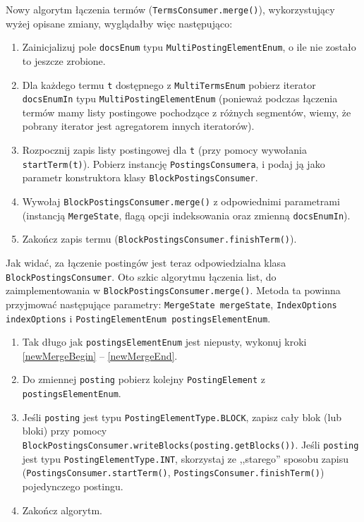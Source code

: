 Nowy algorytm łączenia termów (\texttt{TermsConsumer.merge()}), wykorzystujący wyżej opisane zmiany, wyglądałby więc następująco:
\begin{enumerate}
 \item Zainicjalizuj pole \texttt{docsEnum} typu \texttt{MultiPostingElementEnum}, o ile nie zostało to jeszcze zrobione.
 \item Dla każdego termu \texttt{t} dostępnego z \texttt{MultiTermsEnum} pobierz iterator \texttt{docsEnumIn} typu \texttt{MultiPostingElementEnum} (ponieważ podczas łączenia termów mamy listy postingowe pochodzące z różnych segmentów, wiemy, że pobrany iterator jest agregatorem innych iteratorów).
 \item Rozpocznij zapis listy postingowej dla \texttt{t} (przy pomocy wywołania \texttt{startTerm(t)}). Pobierz instancję \texttt{PostingsConsumera}, i podaj ją jako parametr konstruktora klasy \texttt{BlockPostingsConsumer}.
 \item Wywołaj \texttt{BlockPostingsConsumer.merge()} z odpowiednimi parametrami (instancją \texttt{MergeState}, flagą opcji indeksowania oraz zmienną \texttt{docsEnumIn}).
 \item Zakończ zapis termu (\texttt{BlockPostingsConsumer.finishTerm()}).
\end{enumerate}

Jak widać, za łączenie postingów jest teraz odpowiedzialna klasa \texttt{BlockPostingsConsumer}. Oto szkic algorytmu łączenia list, do zaimplementowania w \texttt{BlockPostingsConsumer.merge()}. Metoda ta powinna przyjmować następujące parametry: \texttt{MergeState mergeState}, \texttt{IndexOptions indexOptions} i \texttt{PostingElementEnum postingsElementEnum}.
\begin{enumerate}
 \item Tak długo jak \texttt{postingsElementEnum} jest niepusty, wykonuj kroki \ref{newMergeBegin} -- \ref{newMergeEnd}.
 \item \label{newMergeBegin} Do zmiennej \texttt{posting} pobierz kolejny \texttt{PostingElement} z \texttt{postingsElementEnum}.
 \item \label{newMergeEnd} Jeśli \texttt{posting} jest typu \texttt{PostingElementType.BLOCK}, zapisz cały blok (lub bloki) przy pomocy \texttt{BlockPostingsConsumer.writeBlocks(posting.getBlocks())}. Jeśli \texttt{posting} jest typu \texttt{PostingElementType.INT}, skorzystaj ze ,,starego'' sposobu zapisu (\texttt{PostingsConsumer.startTerm()}, \texttt{PostingsConsumer.finishTerm()}) pojedynczego postingu.
 \item Zakończ algorytm.
\end{enumerate}

